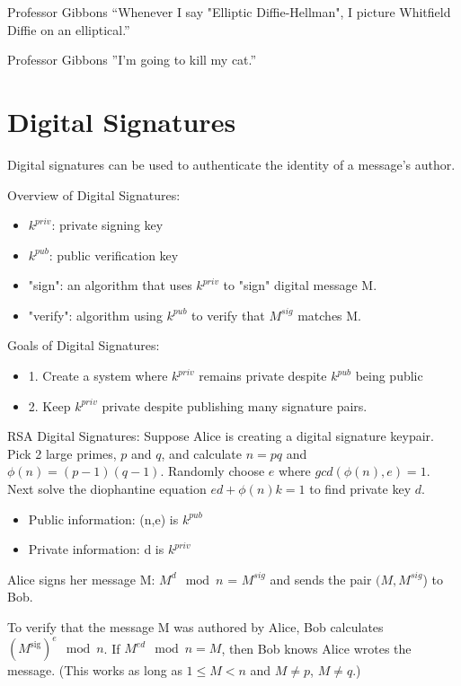 
\begin{chapquote}{Professor Gibbons}
``Whenever I say "Elliptic Diffie-Hellman", I picture Whitfield Diffie on an elliptical.''
\end{chapquote}
\begin{chapquote}{Professor Gibbons}
''I'm going to kill my cat.''
\end{chapquote}

\section{Digital Signatures}
Digital signatures can be used to authenticate the identity of a message's author.

Overview of Digital Signatures:
\begin{itemize}
\item $k^{priv}$: private signing key
\item $k^{pub}$: public verification key
\item "sign": an algorithm that uses $k^{priv}$ to "sign" digital message M. 
\item "verify": algorithm using $k^{pub}$ to verify that $M^{sig}$ matches M.
\end{itemize}

Goals of Digital Signatures:
\begin{itemize}
\item 1. Create a system where $k^{priv}$ remains private despite $k^{pub}$ being public
\item 2. Keep $k^{priv}$ private despite publishing many signature pairs.
\end{itemize}

RSA Digital Signatures:
Suppose Alice is creating a digital signature keypair. Pick 2 large primes, $p$ and $q$, and calculate $n=pq$ and $\phi(n)=(p-1)(q-1)$. Randomly choose $e$ where $gcd(\phi(n),e)=1$. Next solve the diophantine equation $ed+\phi(n)k=1$ to find private key $d$.


\begin{itemize}
\item Public information: (n,e) is $k^{pub}$
\item Private information: d is $k^{priv}$
\end{itemize}

Alice signs her message M: $M^{d}\mod{n}$ = $M^{sig}$ and sends the pair $(M, M^{sig}$) to Bob.

To verify that the message M was authored by Alice, Bob calculates $(M^{\text{sig}})^{e}\mod{n}$. If $M^{ed}\mod{n} = M$, then Bob knows Alice wrotes the message. (This works as long as $1 \leq M < n$ and $M \ne p$, $M \ne q$.)

